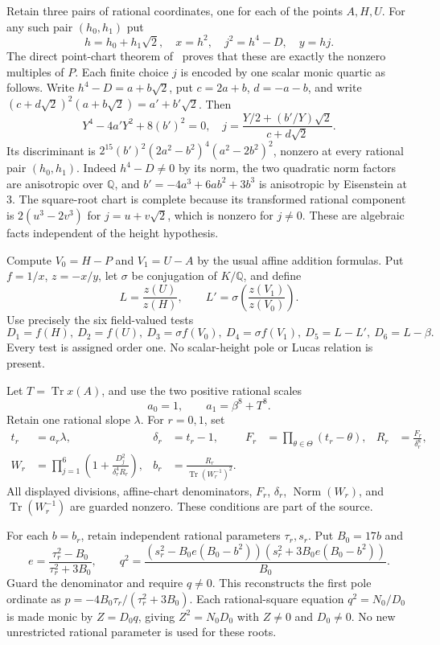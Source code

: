 \documentclass[11pt,a4paper]{article}
\newcommand{\Q}{\mathbb Q}\newcommand{\Z}{\mathbb Z}
\DeclareMathOperator{\Tr}{Tr}\DeclareMathOperator{\rad}{rad}
\begin{document}
Retain three pairs of rational coordinates, one for each of the
points $A,H,U$. For any such pair $(h_0,h_1)$ put
\[
 h=h_0+h_1\sqrt2,\quad x=h^2,\quad j^2=h^4-D,\quad y=hj.
\]
The direct point-chart theorem of~\cite{Source27} proves that
these are exactly the nonzero multiples of $P$. Each finite
choice $j$ is encoded by one scalar monic quartic as follows.
Write $h^4-D=a+b\sqrt2$, put
$c=2a+b$, $d=-a-b$, and write
$(c+d\sqrt2)^2(a+b\sqrt2)=a'+b'\sqrt2$.
Then
\[
 Y^4-4a'Y^2+8(b')^2=0,\quad
 j=\frac{Y/2+(b'/Y)\sqrt2}{c+d\sqrt2}.
\]
Its discriminant is
$2^{15}(b')^2(2a^2-b^2)^4(a^2-2b^2)^2$, nonzero at every
rational pair $(h_0,h_1)$. Indeed $h^4-D\ne0$ by its norm,
the two quadratic norm factors are anisotropic over $\Q$, and
$b'=-4a^3+6ab^2+3b^3$ is anisotropic by Eisenstein at 3.
The square-root chart is complete because its transformed rational
component is $2(u^3-2v^3)$ for $j=u+v\sqrt2$, which is nonzero
for $j\ne0$. These are algebraic facts independent of the height hypothesis.

Compute $V_0=H-P$ and $V_1=U-A$ by the usual affine addition
formulas. Put $f=1/x$, $z=-x/y$, let $\sigma$ be conjugation
of $K/\Q$, and define
\[
 L=\frac{z(U)}{z(H)},\qquad
 L'=\sigma\!\left(\frac{z(V_1)}{z(V_0)}\right).
\]
Use precisely the six field-valued tests
\begin{equation}\label{eq:tests}
 D_1=f(H),\ D_2=f(U),\ D_3=\sigma f(V_0),\
 D_4=\sigma f(V_1),\ D_5=L-L',\ D_6=L-\beta.
\end{equation}
Every test is assigned order one. No scalar-height pole or Lucas
relation is present.

Let $T=\Tr x(A)$, and use the two positive rational scales
\[
                         a_0=1,\qquad a_1=\beta^8+T^8.
\]
Retain one rational slope $\lambda$. For $r=0,1$, set
\begin{align}
 t_r&=a_r\lambda,&\delta_r&=t_r-1,&
 F_r&=\prod_{\theta\in\Theta}(t_r-\theta),&
 R_r&=\frac{F_r}{\delta_r^8},\label{eq:detector}\\
 W_r&=\prod_{j=1}^6\left(1+
             \frac{D_j^2}{\delta_r^4R_r}\right),&
 b_r&=\frac{R_r}{\Tr(W_r^{-1})^2}.\label{eq:W}
\end{align}
All displayed divisions, affine-chart denominators, $F_r$,
$\delta_r$, $\operatorname{Norm}(W_r)$, and $\Tr(W_r^{-1})$
are guarded nonzero. These conditions are part of the source.

For each $b=b_r$, retain independent rational parameters $\tau_r,s_r$.
Put $B_0=17b$ and
\[
 e=\frac{\tau_r^2-B_0}{\tau_r^2+3B_0},\qquad
 q^2=\frac{(s_r^2-B_0e(B_0-b^2))
                  (s_r^2+3B_0e(B_0-b^2))}{B_0}.
\]
Guard the denominator and require $q\ne0$. This reconstructs
the first pole ordinate as
$p=-4B_0\tau_r/(\tau_r^2+3B_0)$.
Each rational-square equation $q^2=N_0/D_0$ is made monic
by $Z=D_0q$, giving $Z^2=N_0D_0$ with $Z\ne0$ and $D_0\ne0$.
No new unrestricted rational parameter is used for these roots.
\end{document}
